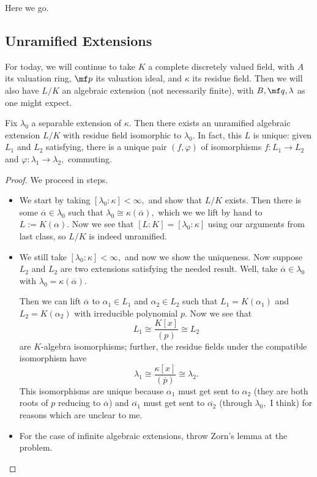 














Here we go.

\subsection{Unramified Extensions}
For today, we will continue to take $K$ a complete discretely valued field, with $A$ its valuation ring, $\mf p$ its valuation ideal, and $\kappa$ its residue field. Then we will also have $L/K$ an algebraic extension (not necessarily finite), with $B,\mf q,\lambda$ as one might expect.
\begin{proposition}
	Fix $\lambda_0$ a separable extension of $\kappa.$ Then there exists an unramified algebraic extension $L/K$ with residue field isomorphic to $\lambda_0.$ In fact, this $L$ is unique: given $L_1$ and $L_2$ satisfying, there is a unique pair $(f,\varphi)$ of isomorphisms $f:L_1\to L_2$ and $\varphi:\lambda_1\to\lambda_2,$ commuting.
\end{proposition}
\begin{proof}
	We proceed in steps.
	\begin{itemize}
		\item We start by taking $[\lambda_0:\kappa]<\infty,$ and show that $L/K$ exists. Then there is some $\overline\alpha\in\lambda_0$ such that $\lambda_0\cong\kappa(\overline\alpha),$ which we we lift by hand to $L:=K(\alpha).$ Now we see that $[L:K]=[\lambda_0:\kappa]$ using our arguments from last class, so $L/K$ is indeed unramified.
		\item We still take $[\lambda_0:\kappa]<\infty,$ and now we show the uniqueness. Now suppose $L_2$ and $L_2$ are two extensions satisfying the needed result. Well, take $\overline\alpha\in\lambda_0$ with $\lambda_0=\kappa(\overline\alpha).$

		Then we can lift $\overline\alpha$ to $\alpha_1\in L_1$ and $\alpha_2\in L_2$ such that $L_1=K(\alpha_1)$ and $L_2=K(\alpha_2)$ with irreducible polynomial $p.$ Now we see that
		\[L_1\cong\frac{K[x]}{(p)}\cong L_2\]
		are $K$-algebra isomorphisms; further, the residue fields under the compatible isomorphism have
		\[\lambda_1\cong\frac{\kappa[x]}{(\overline p)}\cong\lambda_2.\]
		This isomorphisms are unique because $\alpha_1$ must get sent to $\alpha_2$ (they are both roots of $p$ reducing to $\overline\alpha$) and $\overline{\alpha_1}$ must get sent to $\overline{\alpha_2}$ (through $\lambda_0,$ I think) for reasons which are unclear to me. \todo{}
		\item For the case of infinite algebraic extensions, throw Zorn's lemma at the problem.
		\qedhere
	\end{itemize}
\end{proof}
